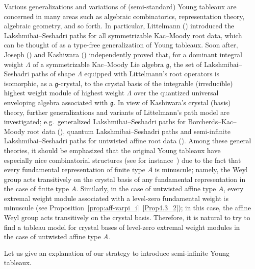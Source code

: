 \documentclass[10pt]{amsart}
\theoremstyle{definition}\newtheorem{defi}[theo]{Definition}
\theoremstyle{remark}\newtheorem{rema}[theo]{Remark}
\newcommand{\eg}{e.g.\ }\newcommand{\ie}{i.e.\ }\newcommand{\resp}{resp.\ }\newcommand{\cf}{cf.\ }
\newcommand{\Fg}{\mathfrak{g}}
\begin{document}
Various generalizations and variations of (semi-standard) Young tableaux 
are concerned in many areas such as 
algebraic combinatorics, representation theory, algebraic geometry, and so forth. 
In particular, 
Littelmann (\cite{L94,L95}) introduced the Lakshmibai--Seshadri paths 
for all symmetrizable Kac--Moody root data, 
which can be thought of as a type-free generalization of Young tableaux. 
Soon after, Joseph (\cite{J}) and Kashiwara (\cite{K96}) independently proved that, 
for a dominant integral weight $\Lambda$ of a symmetrizable Kac--Moody Lie algebra $\Fg$, 
the set of Lakshmibai--Seshadri paths of shape $\Lambda$ 
equipped with Littelmann's root operators 
is isomorphic, as a $\Fg$-crystal, to the crystal basis of 
the integrable (irreducible) highest weight module of highest weight $\Lambda$ 
over the quantized universal enveloping algebra associated with $\Fg$. 
In view of Kashiwara's crystal (basis) theory, 
further generalizations and variants of Littelmann's path model are investigated; \eg generalized 
Lakshmibai--Seshadri paths for Borcherds--Kac--Moody root data (\cite{I,JL}), 
quantum Lakshmibai--Seshadri paths and 
semi-infinite Lakshmibai--Seshadri paths for untwisted affine root data
(\cite{INS16,LNSSS16}). 
Among these general theories, 
it should be emphasized that the original Young tableaux have especially nice combinatorial structures 
(see for instance~\cite{F,Kw})
due to the fact that every fundamental representation of finite type $A$ is minuscule; 
namely, the Weyl group acts transitively 
on the crystal basis of any fundamental representation in the case of finite type $A$. 
Similarly, in the case of untwisted affine type $A$, 
every extremal weight module associated with a 
level-zero fundamental weight is minuscule (see Proposition~\ref{prop:aff-varpi_i}~\ref{Prop4.3_2}); 
in this case, the affine Weyl group acts transitively on the crystal basis. 
Therefore, it is natural to try to find a tableau model 
for crystal bases of level-zero extremal weight modules 
in the case of untwisted affine type $A$. 

Let us give an explanation of our strategy to introduce semi-infinite Young tableaux. 
\end{document}
